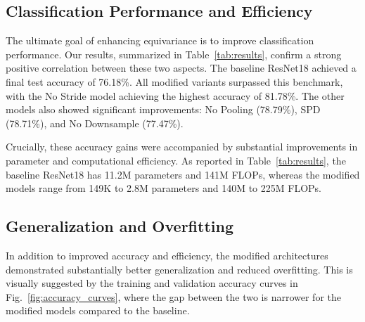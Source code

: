 \documentclass[conference]{IEEEtran}
\begin{document}
\subsection{Classification Performance and Efficiency}\label{subsec:performance_efficiency}
The ultimate goal of enhancing equivariance is to improve classification performance. Our results, summarized in Table~\ref{tab:results}, confirm a strong positive correlation between these two aspects. The baseline ResNet18 achieved a final test accuracy of 76.18\%. All modified variants surpassed this benchmark, with the No Stride model achieving the highest accuracy of 81.78\%. The other models also showed significant improvements: No Pooling (78.79\%), SPD (78.71\%), and No Downsample (77.47\%).

Crucially, these accuracy gains were accompanied by substantial improvements in parameter and computational efficiency. As reported in Table~\ref{tab:results}, the baseline ResNet18 has 11.2M parameters and 141M FLOPs, whereas the modified models range from 149K to 2.8M parameters and 140M to 225M FLOPs. 

\begin{table}[t]
    \caption{Comparison of Performance, Efficiency, and Generalization Metrics}
    \label{tab:results}
    \centering
    \tiny
    \setlength{\tabcolsep}{3pt}
\end{table}

\subsection{Generalization and Overfitting}\label{subsec:generalization}
In addition to improved accuracy and efficiency, the modified architectures demonstrated substantially better generalization and reduced overfitting. This is visually suggested by the training and validation accuracy curves in Fig.~\ref{fig:accuracy_curves}, where the gap between the two is narrower for the modified models compared to the baseline.
\end{document}
